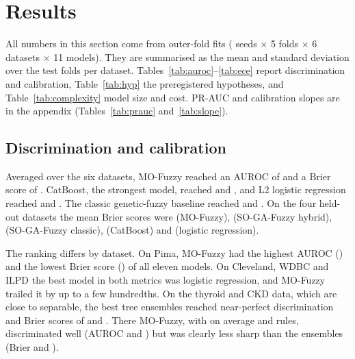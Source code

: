 \section{Results}
\label{sec:results}

All numbers in this section come from \resNFits{} outer-fold fits
(\resNSeeds{} seeds $\times$ 5 folds $\times$ 6 datasets $\times$ 11 models). They are
summarised as the mean and standard deviation over the \resFoldsPerDataset{} test folds
per dataset. Tables~\ref{tab:auroc}--\ref{tab:ece} report discrimination and
calibration, Table~\ref{tab:hyp} the preregistered hypotheses, and
Table~\ref{tab:complexity} model size and cost. PR-AUC and calibration slopes are in
the appendix (Tables~\ref{tab:prauc} and~\ref{tab:slope}).





\subsection{Discrimination and calibration}
Averaged over the six datasets, MO-Fuzzy reached an AUROC of
\resMeanAurocAllMOFuzzyNSGAII{} and a Brier score of \resMeanBrierAllMOFuzzyNSGAII{}.
CatBoost, the strongest model, reached \resMeanAurocAllCatBoost{} and
\resMeanBrierAllCatBoost{}, and L2 logistic regression reached \resMeanAurocAllLogReg{}
and \resMeanBrierAllLogReg{}. The classic genetic-fuzzy baseline reached
\resMeanAurocAllSOGAFuzzyClassic{} and \resMeanBrierAllSOGAFuzzyClassic{}. On the four
held-out datasets the mean Brier scores were \resMeanBrierHeldoutMOFuzzyNSGAII{}
(MO-Fuzzy), \resMeanBrierHeldoutSOGAFuzzyHybrid{} (SO-GA-Fuzzy hybrid),
\resMeanBrierHeldoutSOGAFuzzyClassic{} (SO-GA-Fuzzy classic), \resMeanBrierHeldoutCatBoost{}
(CatBoost) and \resMeanBrierHeldoutLogReg{} (logistic regression).

The ranking differs by dataset. On Pima, MO-Fuzzy had the highest AUROC
(\resMOAurocPima{}) and the lowest Brier score (\resBestBrierPima{}) of all eleven
models. On Cleveland, WDBC and ILPD the best model in both metrics was logistic
regression, and MO-Fuzzy trailed it by up to a few hundredths. On the thyroid and CKD
data, which are close to separable, the best tree ensembles reached near-perfect
discrimination and Brier scores of \resBestBrierThyroid{} and \resBestBrierCKD{}. There
MO-Fuzzy, with on average \resMORulesThyroid{} and \resMORulesCKD{} rules, discriminated
well (AUROC \resMOAurocThyroid{} and \resMOAurocCKD{}) but was clearly less sharp than
the ensembles (Brier \resMOBrierThyroid{} and \resMOBrierCKD{}).

